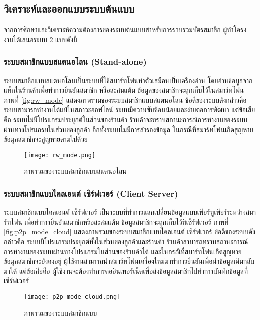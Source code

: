 \documentclass[a4paper]{article}
\begin{document}
\subsection{วิเคราะห์และออกแบบระบบต้นแบบ}

จากการศึกษาและวิเคราะห์ความต้องการของระบบต้นแบบสำหรับการรวบรวมบัตรสมาชิก ผู้ทำโครงงานได้เสนอระบบ 2 แบบดังนี้

\subsubsection{ระบบสมาชิกแบบสแตนอโลน (Stand-alone)}
ระบบสมาชิกแบบสแตนอโลนเป็นระบบที่ใช้สมาร์ทโฟนทำตัวเสมือนเป็นเครื่องอ่าน โดยอ่านข้อมูลจากแท็กในร้านค้าเพื่อทำการยืนยันสมาชิก หรือสะสมแต้ม ข้อมูลของสมาชิกจะถูกเก็บไว้ในสมาร์ทโฟน ภาพที่ \ref{fig:rw_mode} แสดงภาพรวมของระบบสมาชิกแบบสแตนอโลน ข้อดีของระบบดังกล่าวคือ ระบบสามารถทำงานได้แม้ในสภาวะออฟไลน์ ระบบมีความซับซ้อนน้อยและง่ายต่อการพัฒนา แต่ข้อเสียคือ ระบบไม่มีโปรแกรมประยุกต์ในส่วนของร้านค้า ร้านค้าจะทราบสถานะการณ์การทำงานของระบบผ่านทางโปรแกรมในส่วนของลูกค้า อีกทั้งระบบไม่มีการสำรองข้อมูล ในกรณีที่สมาร์ทโฟนเกิดสูญหาย ข้อมูลสมาชิกจะสูญหายตามไปด้วย

\begin{figure}[ht!]
\centering
\texttt{[image: rw\_mode.png]}
\caption{ภาพรวมของระบบสมาชิกแบบสแตนอโลน} \label{fig:rw_mode}
\label{overflow}
\end{figure}

\subsubsection{ระบบสมาชิกแบบไคลเอนต์ เซิร์ฟเวอร์ (Client Server)}
ระบบสมาชิกแบบไคลเอนต์ เซิร์ฟเวอร์ เป็นระบบที่ทำการแลกเปลี่ยนข้อมูลแบบเพียร์ทูเพียร์ระหว่างสมาร์ทโฟน เพื่อทำการยืนยันสมาชิกหรือสะสมแต้ม ข้อมูลสมาชิกจะถูกเก็บไว้ที่เซิร์ฟเวอร์ ภาพที่ \ref{fig:p2p_mode_cloud} แสดงภาพรวมของระบบสมาชิกแบบไคลเอนต์ เซิร์ฟเวอร์ ข้อดีของระบบดังกล่าวคือ ระบบมีโปรแกรมประยุกต์ทั้งในส่วนของลูกค้าและร้านค้า ร้านค้าสามารถทราบสถานะการณ์การทำงานของระบบผ่านทางโปรแกรมในส่วนของร้านค้าได้ และในกรณีที่สมาร์ทโฟนเกิดสูญหาย ข้อมูลสมาชิกจะยังคงอยู่ ผู้ใช้งานสามารถนำสมาร์ทโฟนเครื่องใหม่มาทำการยืนยันเพื่อนำข้อมูลเดิมกลับมาได้ แต่ข้อเสียคือ ผู้ใช้งานจะต้องทำการต่ออินเทอร์เน็ตเพื่อส่งข้อมูลสมาชิกไปทำการบันทึกข้อมูลที่เซิร์ฟเวอร์

\begin{figure}[ht!]
\centering
\texttt{[image: p2p\_mode\_cloud.png]}
\caption{ภาพรวมของระบบสมาชิกแบบ} \label{fig:p2p_mode_cloud}
\label{overflow}
\end{figure}
\end{document}
